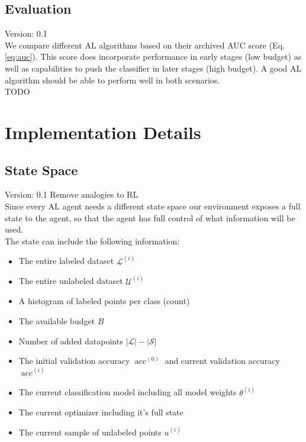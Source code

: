 \documentclass[]{article}
\begin{document}
\subsection{Evaluation}\label{sec:evaluation}
{\color{red} Version: 0.1}\\
We compare different AL algorithms based on their archived AUC score (Eq. \ref{eq:auc}).
This score does incorporate performance in early stages (low budget) as well as capabilities to push the classifier in later stages (high budget).
A good AL algorithm should be able to perform well in both scenarios. \\
{\color{red} TODO}


\section{Implementation Details}

\subsection{State Space}
{\color{red} Version: 0.1 Remove analogies to RL}\\
Since every AL agent needs a different state space our environment exposes a full state to the agent, so that the agent has full control of what information will be used. \\ [1mm]
The state can include the following information:
\begin{itemize}
	\item The entire labeled dataset $\mathcal{L}^{(i)}$
	\item The entire unlabeled dataset $\mathcal{U}^{(i)}$
	\item A histogram of labeled points per class (count)
	\item The available budget $B$
	\item Number of added datapoints $|\mathcal{L}| - |\mathcal{S}|$
	\item The initial validation accuracy $\operatorname{acc}^{(0)}$ and current validation accuracy $\operatorname{acc}^{(i)}$
	\item The current classification model including all model weights $\theta^{(i)}$
	\item The current optimizer including it's full state
	\item The current sample of unlabeled points $u^{(i)}$
\end{itemize}
\end{document}
